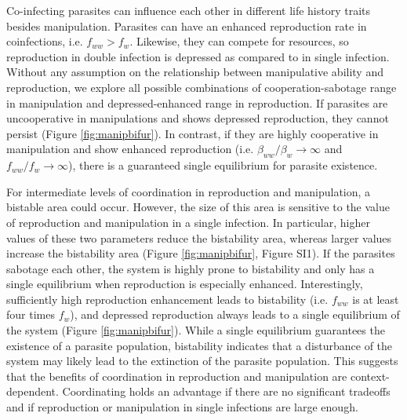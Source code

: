 \documentclass[a4paper]{scrartcl}
\begin{document}
Co-infecting parasites can influence each other in different life history traits besides manipulation.
Parasites can have an enhanced reproduction rate in coinfections, i.e. $f_{ww} > f_w$. 
Likewise, they can compete for resources, so reproduction in double infection is depressed as compared to in single infection. 
Without any assumption on the relationship between manipulative ability and reproduction, we explore all possible combinations of cooperation-sabotage range in manipulation and depressed-enhanced range in reproduction.
If parasites are uncooperative in manipulations and shows depressed reproduction, they cannot persist (Figure \ref{fig:manipbifur}). 
In contrast, if they are highly cooperative in manipulation and show enhanced reproduction (i.e. $\beta_{ww}/\beta_w \rightarrow \infty$ and $f_{ww}/f_w \rightarrow \infty$), there is a guaranteed single equilibrium for parasite existence. 

For intermediate levels of coordination in reproduction and manipulation, a bistable area could occur.
However, the size of this area is sensitive to the value of reproduction and manipulation in a single infection. 
In particular, higher values of these two parameters reduce the bistability area, whereas larger values increase the bistability area (Figure \ref{fig:manipbifur}, Figure SI1).
If the parasites sabotage each other, the system is highly prone to bistability and only has a single equilibrium when reproduction is especially enhanced.
Interestingly, sufficiently high reproduction enhancement leads to bistability (i.e. $f_{ww}$ is at least four times $f_w$), and depressed reproduction always leads to a single equilibrium of the system (Figure \ref{fig:manipbifur}). 
While a single equilibrium guarantees the existence of a parasite population, bistability indicates that a disturbance of the system may likely lead to the extinction of the parasite population. 
This suggests that the benefits of coordination in reproduction and manipulation are context-dependent. 
Coordinating holds an advantage if there are no significant tradeoffs and if reproduction or manipulation in single infections are large enough. 
\end{document}

